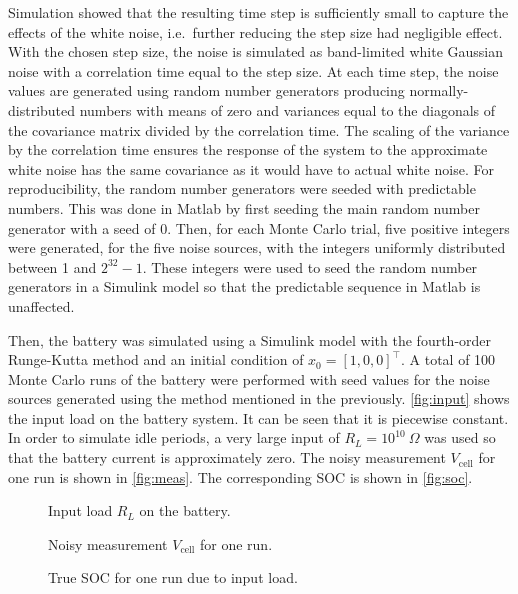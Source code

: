 \documentclass[../zhang_thesis.tex]{subfiles}
\begin{document}
Simulation showed that the resulting time step is sufficiently small to capture the effects of the white noise, i.e.\ further reducing the step size had negligible effect. With the chosen step size, the noise is simulated as band-limited white Gaussian noise with a correlation time equal to the step size. At each time step, the noise values are generated using random number generators producing
normally-distributed numbers with means of zero and variances equal to the diagonals of the covariance matrix divided by the correlation time. The scaling of the variance by the correlation time ensures the response of the system to the approximate white noise has the same covariance as it would have to actual white noise. For reproducibility, the random number generators were seeded with predictable numbers. This was done in Matlab by first seeding the main random number generator with a
seed of 0. Then, for each Monte Carlo trial, five positive integers were generated, for the five noise sources, with the integers uniformly distributed between 1 and $2^{32}-1$. These integers were used to seed the random number generators in a Simulink model so that the predictable sequence in Matlab is unaffected.

Then, the battery was simulated using a Simulink model with the fourth-order Runge-Kutta method and an initial condition of $x_0=[1,0,0]^\top$. A total of 100 Monte Carlo runs of the battery were performed with seed values for the noise sources generated using the method mentioned in the previously. \autoref{fig:input} shows the input load on the battery system. It can be seen that it is piecewise constant. In order to simulate idle periods, a very large input of $R_L=10^{10}~\Omega$ was
used so that the battery current is approximately zero. The noisy measurement $V_\text{cell}$ for one run is shown in \autoref{fig:meas}. The corresponding SOC is shown in \autoref{fig:soc}.

\begin{figure}[htb]
\centering

\caption{Input load $R_L$ on the battery.}
\label{fig:input}
\end{figure}

\begin{figure}[htb]
\centering

\caption{Noisy measurement $V_\text{cell}$ for one run.}
\label{fig:meas}
\end{figure}

\begin{figure}[htb]
\centering

\caption{True SOC for one run due to input load.}
\label{fig:soc}
\end{figure}
\end{document}
